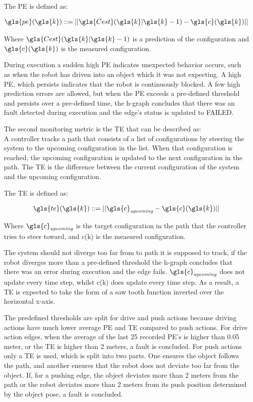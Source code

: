 The \ac{PE} is defined as:

\[ \gls{pe}(\gls{k}) ::= ||\gls{Cest}(\gls{k}|\gls{k}-1) - \gls{c}(\gls{k})|| \]

Where $\gls{Cest}(\gls{k}|\gls{k}-1)$ is a prediction of the configuration and $\gls{c}(\gls{k})$ is the measured configuration.\bs

During execution a sudden high \ac{PE} indicates unexpected behavior occurs, such as when the robot has driven into an object which it was not expecting. A high \ac{PE}, which persists indicates that the robot is continuously blocked. A few high prediction errors are allowed, but when the \ac{PE} exceeds a pre-defined threshold and persists over a pre-defined time, the \ac{h-graph} concludes that there was an fault detected during execution and the edge's status is updated to FAILED.\bs

The second monitoring metric is the \acl{TE} that can be described as:\\ A controller tracks a path that consists of a list of configurations by steering the system to the upcoming configuration in the list. When that configuration is reached, the upcoming configuration is updated to the next configuration in the path. The \ac{TE} is the difference between the current configuration of the system and the upcoming configuration.\bs

The \ac{TE} is defined as:

\[ \gls{te}(\gls{k}) ::= ||\gls{c}_\mathit{upcoming} - \gls{c}(\gls{k})|| \]

Where $\gls{c}_\mathit{upcoming}$ is the target configuration in the path that the controller tries to steer toward, and \gls{c}(\gls{k}) is the measured configuration.\bs

The system should not diverge too far from to path it is supposed to track, if the robot diverges more than a pre-defined threshold the \ac{h-graph} concludes that there was an error during execution and the edge fails. $\gls{c}_\mathit{upcoming}$ does not update every time step, whilst \gls{c}(\gls{k}) does update every time step. As a result, a  \ac{TE} is expected to take the form of a saw tooth function inverted over the horizontal x-axis.\bs

The predefined thresholds are split for drive and push actions because driving actions have much lower average \ac{PE} and \ac{TE} compared to push actions. For drive action edges, when the average of the last 25 recorded \ac{PE}'s is higher than 0.05 meter, or the \ac{TE} is higher than 2 meters, a fault is concluded. For push actions only a \ac{TE} is used, which is split into two parts. One ensures the object follows the path, and another ensures that the robot does not deviate too far from the object. If, for a pushing edge, the object deviates more than 2 meters from the path or the robot deviates more than 2 meters from its push position determined by the object pose, a fault is concluded.\bs

